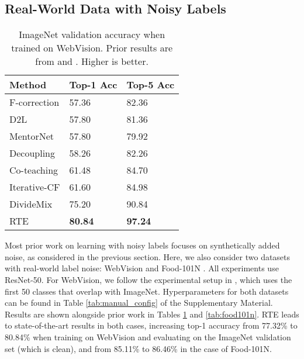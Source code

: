 \documentclass{article}
\renewcommand{\b}[1]{\textbf{#1}}
\begin{document}
\subsection{Real-World Data with Noisy Labels}

\begin{table}\renewcommand{\arraystretch}{1.3}
\centering
\caption{ImageNet validation accuracy when trained on WebVision. Prior results are from \cite{chen2019} and \cite{li2020}. Higher is better.}
\label{tab:webvision}
\begin{tabular}{lll}
\toprule
Method             & Top-1 Acc    & Top-5 Acc  \\
\hline
F-correction       & 57.36        & 82.36      \\
D2L                & 57.80        & 81.36      \\
MentorNet          & 57.80        & 79.92      \\
Decoupling         & 58.26        & 82.26      \\
Co-teaching        & 61.48        & 84.70      \\
Iterative-CF       & 61.60        & 84.98      \\
DivideMix          & 75.20        & 90.84      \\
RTE                & \b{80.84}    & \b{97.24}  \\
\bottomrule
\end{tabular}
\end{table}

Most prior work on learning with noisy labels focuses on synthetically added noise, as considered in the previous section. Here, we also consider two datasets with real-world label noise: WebVision \cite{li2017webvision} and Food-101N \cite{lee2018}. All experiments use ResNet-50. For WebVision, we follow the experimental setup in \cite{li2020}, which uses the first 50 classes that overlap with ImageNet. Hyperparameters for both datasets can be found in Table \ref{tab:manual_config} of the Supplementary Material. Results are shown alongside prior work in Tables \ref{tab:webvision} and \ref{tab:food101n}. RTE leads to state-of-the-art results in both cases, increasing top-1 accuracy from 77.32\% \cite{li2020} to 80.84\% when training on WebVision and evaluating on the ImageNet validation set (which is clean), and from 85.11\% to 86.46\% in the case of Food-101N.
\end{document}

